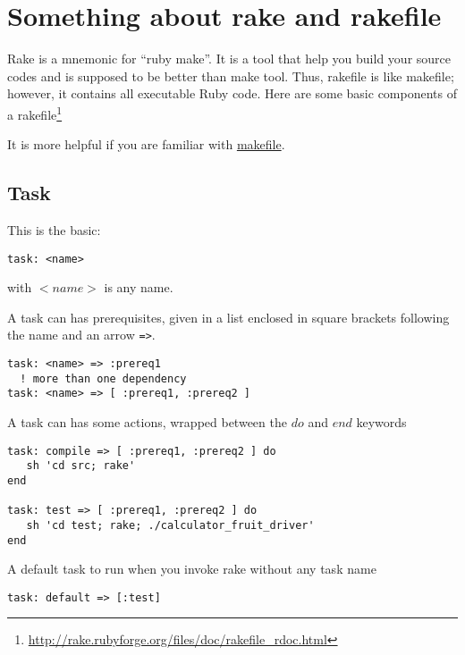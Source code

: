 \section{Something about rake and rakefile}
\label{sec:someth-about-rakef}

Rake is a mnemonic for ``ruby make''. It is a tool that help you build
your source codes and is supposed to be better than make tool. Thus,
rakefile is like makefile; however, it contains all executable Ruby
code. Here are some basic components of a
rakefile\footnote{\url{http://rake.rubyforge.org/files/doc/rakefile_rdoc.html}}

It is more helpful if you are familiar with
\hyperref[chap:make-tool]{makefile}. 

\subsection{Task}
\label{sec:task}

This is the basic:
\begin{verbatim}
task: <name>
\end{verbatim}
with $<name>$ is any name.

A task can has prerequisites, given in a list enclosed in square
brackets following the name and an arrow \verb!=>!.
\begin{verbatim}
task: <name> => :prereq1
  ! more than one dependency
task: <name> => [ :prereq1, :prereq2 ]
\end{verbatim}

A task can has some actions, wrapped between the $do$ and $end$
keywords
\begin{verbatim}
task: compile => [ :prereq1, :prereq2 ] do 
   sh 'cd src; rake'
end

task: test => [ :prereq1, :prereq2 ] do 
   sh 'cd test; rake; ./calculator_fruit_driver'
end
\end{verbatim}

A default task to run when you invoke rake without any task name
\begin{verbatim}
task: default => [:test]
\end{verbatim}


